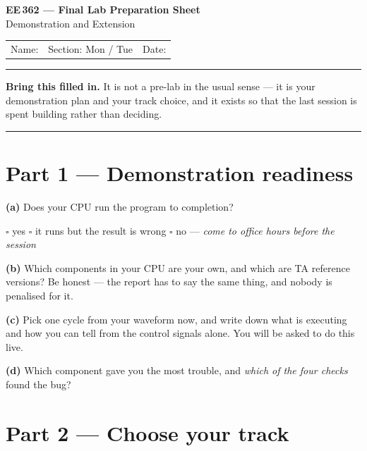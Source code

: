 \documentclass[11pt]{article}
\newcommand{\answerbox}[1]{\vspace{2pt}\fbox{\parbox[c][#1][c]{\dimexpr\linewidth-2\fboxsep-2\fboxrule}{\ }}\vspace{4pt}}
\begin{document}
\begin{center}
{\Large\bfseries EE\,362 --- Final Lab Preparation Sheet}\\[2pt]
{\large Demonstration and Extension}\\[6pt]
\begin{tabular}{@{}p{6.5cm}p{4cm}p{4cm}@{}}
Name: \hrulefill & Section: Mon / Tue & Date: \hrulefill
\end{tabular}
\end{center}

\vspace{2pt}\hrule\vspace{4pt}

{\small\textbf{Bring this filled in.} It is not a pre-lab in the usual sense ---
it is your demonstration plan and your track choice, and it exists so that the
last session is spent building rather than deciding.}

\vspace{4pt}\hrule

\section*{Part 1 --- Demonstration readiness}

\textbf{(a)} Does your CPU run the program to completion?

\vspace{4pt}
$\square$ yes \hfill
$\square$ it runs but the result is wrong \hfill
$\square$ no --- \emph{come to office hours before the session}
\vspace{6pt}

\textbf{(b)} Which components in your CPU are your own, and which are TA
reference versions? Be honest --- the report has to say the same thing, and
nobody is penalised for it.

\answerbox{2.2cm}

\textbf{(c)} Pick one cycle from your waveform now, and write down what is
executing and how you can tell from the control signals alone. You will be asked
to do this live.

\answerbox{2.4cm}

\textbf{(d)} Which component gave you the most trouble, and \emph{which of the
four checks} found the bug?

\answerbox{2.0cm}

\section*{Part 2 --- Choose your track}
\end{document}

